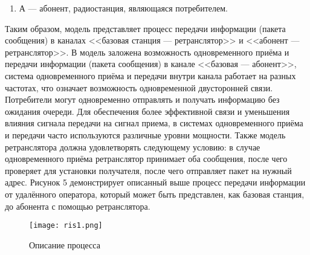 \begin{onehalfspace}
\begin{enumerate}
		\item А — абонент, радиостанция, являющаяся потребителем.
	\end{enumerate}
 
	Таким образом, модель представляет процесс передачи информации (пакета сообщения) в каналах <<базовая станция — ретранслятор>> и <<абонент — ретранслятор>>. В модель заложена возможность одновременного приёма и передачи информации (пакета сообщения) в канале <<базовая — абонент>>, система одновременного приёма и передачи внутри канала работает на разных частотах, что означает возможность одновременной двусторонней связи. Потребители могут одновременно отправлять и получать информацию без ожидания очереди. Для обеспечения более эффективной связи и уменьшения влияния сигнала передачи на сигнал приема, в системах одновременного приёма и передачи часто используются различные уровни мощности. Также модель ретранслятора должна удовлетворять следующему условию: в случае одновременного приёма ретранслятор принимает оба сообщения, после чего проверяет для установки получателя, после чего отправляет пакет на нужный адрес. Рисунок 5 демонстрирует описанный выше процесс передачи информации от удалённого оператора, который может быть представлен, как базовая станция, до абонента с помощью ретранслятора.  	

\end{onehalfspace}
    
	
	\begin{center}
		\begin{figure}[h]
			\centering
			\texttt{[image: ris1.png]}
			\caption{Описание процесса}
			\label{fig:model6}
		\end{figure}
	\end{center}

